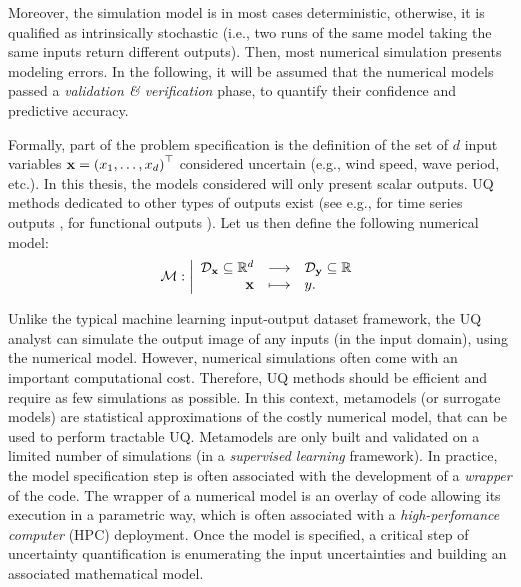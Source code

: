 Moreover, the simulation model is in most cases deterministic, otherwise, it is qualified as intrinsically stochastic (i.e., two runs of the same model taking the same inputs return different outputs).
Then, most numerical simulation presents modeling errors. 
In the following, it will be assumed that the numerical models passed a \textit{validation \& verification} phase, to quantify their confidence and predictive accuracy. 

Formally, part of the problem specification is the definition of the set of $d$ input variables ${\bf x} = \left(x_1, \dots, x_d\right)^\top$ considered uncertain (e.g., wind speed, wave period, etc.). 
In this thesis, the models considered will only present scalar outputs. 
UQ methods dedicated to other types of outputs exist (see e.g., for time series outputs \citet{lataniotis_2019}, for functional outputs \citet{auder_2012,rollon_2021}). 
Let us then define the following numerical model:
\begin{equation}
\mathcal{M} : \bigg|
    \begin{array}{rcl}
        \mathcal{D}_{{\bf x}} \subseteq \mathbb{R}^d & \longrightarrow & \mathcal{D}_{{\bf y}} \subseteq \mathbb{R} \\
        {\bf x} & \longmapsto & y.
    \end{array}
\end{equation}

Unlike the typical machine learning input-output dataset framework, the UQ analyst can simulate the output image of any inputs (in the input domain), using the numerical model. 
However, numerical simulations often come with an important computational cost. 
Therefore, UQ methods should be efficient and require as few simulations as possible. 
In this context, metamodels (or surrogate models) are statistical approximations of the costly numerical model, that can be used to perform tractable UQ. 
Metamodels are only built and validated on a limited number of simulations (in a \textit{supervised learning} framework).
In practice, the model specification step is often associated with the development of a \textit{wrapper} of the code. 
The wrapper of a numerical model is an overlay of code allowing its execution in a parametric way, which is often associated with a \textit{high-perfomance computer} (HPC) deployment.  
Once the model is specified, a critical step of uncertainty quantification is enumerating the input uncertainties and building an associated mathematical model.


